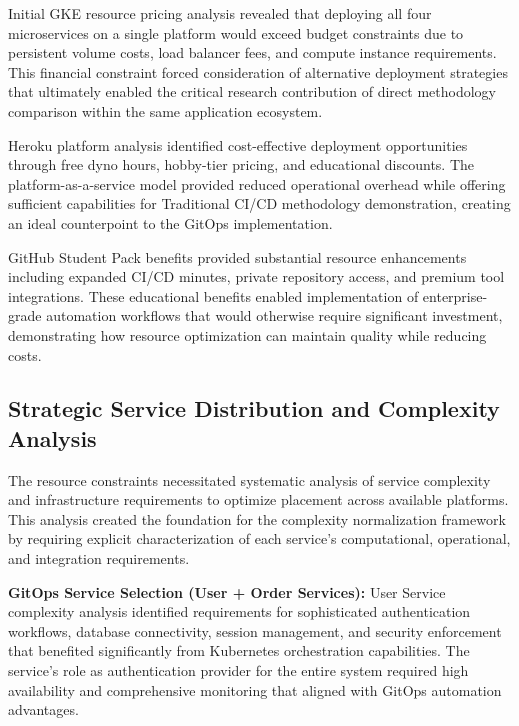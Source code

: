 Initial GKE resource pricing analysis revealed that deploying all four microservices on a single platform would exceed budget constraints due to persistent volume costs, load balancer fees, and compute instance requirements. This financial constraint forced consideration of alternative deployment strategies that ultimately enabled the critical research contribution of direct methodology comparison within the same application ecosystem.


Heroku platform analysis identified cost-effective deployment opportunities through free dyno hours, hobby-tier pricing, and educational discounts. The platform-as-a-service model provided reduced operational overhead while offering sufficient capabilities for Traditional CI/CD methodology demonstration, creating an ideal counterpoint to the GitOps implementation.

GitHub Student Pack benefits provided substantial resource enhancements including expanded CI/CD minutes, private repository access, and premium tool integrations. These educational benefits enabled implementation of enterprise-grade automation workflows that would otherwise require significant investment, demonstrating how resource optimization can maintain quality while reducing costs.

\subsection{Strategic Service Distribution and Complexity Analysis}

The resource constraints necessitated systematic analysis of service complexity and infrastructure requirements to optimize placement across available platforms. This analysis created the foundation for the complexity normalization framework by requiring explicit characterization of each service's computational, operational, and integration requirements.

\textbf{GitOps Service Selection (User + Order Services):}
User Service complexity analysis identified requirements for sophisticated authentication workflows, database connectivity, session management, and security enforcement that benefited significantly from Kubernetes orchestration capabilities. The service's role as authentication provider for the entire system required high availability and comprehensive monitoring that aligned with GitOps automation advantages.

